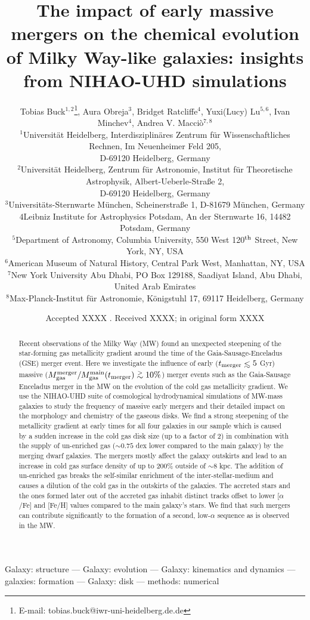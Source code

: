 \documentclass[useAMS,usenatbib]{mnras}
\title[Early massive accretion events in MW-mass galaxies]{The impact of early massive mergers on the chemical evolution of Milky Way-like galaxies: insights from NIHAO-UHD simulations}
\author[T. Buck] {Tobias Buck$^{1,2}$\thanks{E-mail: tobias.buck@iwr-uni-heidelberg.de.de}, Aura Obreja$^{3}$, Bridget Ratcliffe$^{4}$, Yuxi(Lucy) Lu$^{5, 6}$, 
\newauthor Ivan Minchev$^{4}$, Andrea V. Macci\`o$^{7,8}$ \\  %
%
$^1$Universit\"at Heidelberg, Interdisziplin\"ares Zentrum f\"ur Wissenschaftliches Rechnen, Im Neuenheimer Feld 205, \\ D-69120 Heidelberg, Germany\\
$^2$Universit\"at Heidelberg, Zentrum f\"ur Astronomie, Institut f\"ur Theoretische Astrophysik, Albert-Ueberle-Straße 2, \\ D-69120 Heidelberg, Germany\\
$^3$Universit\"ats-Sternwarte M\"unchen, Scheinerstraße 1, D-81679 M\"unchen, Germany\\
${4}$Leibniz Institute for Astrophysics Potsdam, An der Sternwarte 16, 14482 Potsdam, Germany\\
$^{5}$Department of Astronomy, Columbia University, 550 West 120$^{\rm th}$ Street, New York, NY, USA\\
$^{6}$American Museum of Natural History, Central Park West, Manhattan, NY, USA\\
$^7$New York University Abu Dhabi, PO Box 129188, Saadiyat Island, Abu Dhabi, United Arab Emirates\\
$^8$Max-Planck-Institut f\"ur Astronomie, K\"onigstuhl 17, 69117 Heidelberg, Germany
}
\newcommand{\gtsima}{$\; \buildrel > \over \sim \;$}
\newcommand{\gsim}{\lower.5ex\hbox{\gtsima}}
\def\lesssim{\mathrel{\hbox{\rlap{\hbox{\lower4pt\hbox{$\sim$}}}\hbox{$<$}}}}
\begin{document}
\date{Accepted XXXX . Received XXXX; in original form XXXX}

\pagerange{\pageref{firstpage}--\pageref{lastpage}} 

\maketitle

\label{firstpage}


\begin{abstract}
Recent observations of the Milky Way (MW) found an unexpected steepening of the star-forming gas metallicity gradient around the time of the Gaia-Sausage-Enceladus (GSE) merger event.
Here we investigate the influence of early ($t_{\rm{merger}}\lesssim5$ Gyr) massive ($M_{\rm{gas}}^{\rm{merger}}/M_{\rm{gas}}^{\rm{main}}(t_{\rm{merger}})\gsim10\%$) merger events such as the Gaia-Sausage Enceladus merger in the MW on the evolution of the cold gas metallicity gradient. We use the NIHAO-UHD suite of cosmological hydrodynamical simulations of MW-mass galaxies to study the frequency of massive early mergers and their detailed impact on the morphology and chemistry of the gaseous disks. 
We find a strong steepening of the metallicity gradient at early times for all four galaxies in our sample which is caused by a sudden increase in the cold gas disk size (up to a factor of 2) in combination with the supply of un-enriched gas ($\sim0.75$ dex lower compared to the main galaxy) by the merging dwarf galaxies.
The mergers mostly affect the galaxy outskirts and lead to an increase in cold gas surface density of up to 200\% outside of $\sim8$ kpc. The addition of un-enriched gas breaks the self-similar enrichment of the inter-stellar-medium and causes a dilution of the cold gas in the outskirts of the galaxies. 
The accreted stars and the ones formed later out of the accreted gas inhabit distinct tracks offset to lower [$\alpha$/Fe] and [Fe/H] values compared to the main galaxy's stars. We find that such mergers can contribute significantly to the formation of a second, low-$\alpha$ sequence as is observed in the MW.
\end{abstract}

\noindent
\begin{keywords}

Galaxy: structure --- Galaxy: evolution --- Galaxy: kinematics and dynamics --- galaxies:
  formation --- Galaxy: disk --- methods: numerical
 \end{keywords}
\end{document}
